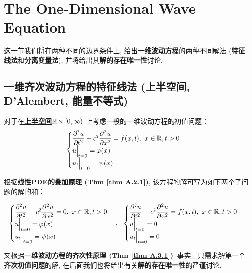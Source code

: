\newpage

\section{The One-Dimensional Wave Equation}
	这一节我们将在两种不同的边界条件上, 给出\textbf{一维波动方程}的两种不同解法 (\textbf{特征线法}和\textbf{分离变量法}), 并将给出其\textbf{解的存在唯一性}讨论. 
	
\subsection{一维齐次波动方程的特征线法 (上半空间, D'Alembert, 能量不等式)}
	对于在\underline{\textbf{上半空间}$\mathbb{R} \times [0 , \infty)$} 上考虑一般的一维波动方程的初值问题：
	\begin{align}
		\begin{cases}
			\dfrac{\partial^2 u}{\partial t^2} - c^2 \dfrac{\partial^2 u}{\partial x^2} = f(x , t) , \,\, x \in \mathbb{R} , t > 0 \\
			u \Big|_{t = 0} = \varphi(x) \\
			u_t \Big|_{t = 0} = \psi(x)
		\end{cases}\label{2.10}
	\end{align}

	\vspace*{1em}
	
	根据\textbf{线性PDE的叠加原理 (Thm \ref{thm A.2.1})}, 该方程的解可写为如下两个子问题的解的和：
	
	\begin{align*}
		\begin{cases}
			\dfrac{\partial^2 u}{\partial t^2} - c^2 \dfrac{\partial^2 u}{\partial x^2} = 0 , \,\, x \in \mathbb{R} , t > 0 \\
			u \Big|_{t = 0} = \varphi(x) \\
			u_t \Big|_{t = 0} = \psi(x)
		\end{cases} , \,\,\,\, 
		\begin{cases}
			\dfrac{\partial^2 u}{\partial t^2} - c^2 \dfrac{\partial^2 u}{\partial x^2} = f(x , t) , \,\, x \in \mathbb{R} , t > 0 \\
			u \Big|_{t = 0} = 0 \\
			u_t \Big|_{t = 0} = 0
		\end{cases}
	\end{align*}
	
	\vspace*{2em}
	
	又根据\textbf{一维波动方程的齐次性原理 (Thm \ref{thm A.3.1})}, 事实上只需求解第一个\textbf{齐次初值问题}的解, 在后面我们也将给出有关\textbf{解的存在唯一性}的严谨讨论. 
	
